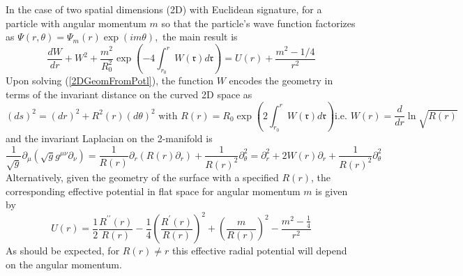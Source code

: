 \documentclass{article}%
\begin{document}
In the case of two spatial dimensions (2D) with Euclidean signature, for a
particle with angular momentum $m$ so that the particle's wave function
factorizes as $\Psi\left(  r,\theta\right)  =\Psi_{m}\left(  r\right)
\exp\left(  im\theta\right)  $,\ the main result is
\begin{equation}
\frac{dW}{dr}+W^{2}+\frac{m^{2}}{R_{0}^{2}}\exp\left(  -4\int_{r_{0}}%
^{r}W\left(  \mathfrak{r}\right)  d\mathfrak{r}\right)  =U\left(  r\right)
+\frac{m^{2}-1/4}{r^{2}} \label{2DGeomFromPotl}%
\end{equation}
Upon solving (\ref{2DGeomFromPotl}), the function $W$ encodes the geometry in
terms of the invariant distance on the curved 2D space as%
\begin{equation}
\left(  ds\right)  ^{2}=\left(  dr\right)  ^{2}+R^{2}\left(  r\right)  \left(
d\theta\right)  ^{2}\text{ \ \ with \ \ }R\left(  r\right)  =R_{0}\exp\left(
2\int_{r_{0}}^{r}W\left(  \mathfrak{r}\right)  d\mathfrak{r}\right)  \text{
\ \ i.e. \ \ }W\left(  r\right)  =\frac{d}{dr}\ln\sqrt{R\left(  r\right)  }
\label{2DMetric}%
\end{equation}
and the invariant Laplacian on the 2-manifold is%
\begin{equation}
\frac{1}{\sqrt{g}}\partial_{\mu}\left(  \sqrt{g}g^{\mu\nu}\partial_{\nu
}\right)  =\frac{1}{R\left(  r\right)  }\partial_{r}\left(  R\left(  r\right)
\partial_{r}\right)  +\frac{1}{R\left(  r\right)  ^{2}}\partial_{\theta}%
^{2}=\partial_{r}^{2}+2W\left(  r\right)  \partial_{r}+\frac{1}{R\left(
r\right)  ^{2}}\partial_{\theta}^{2} \label{2DInvLaplacian}%
\end{equation}
Alternatively, given the geometry of the surface with a specified $R\left(
r\right)  $, the corresponding effective potential in flat space for angular
momentum $m$ is given by%
\begin{equation}
U\left(  r\right)  =\frac{1}{2}\frac{R^{\prime\prime}\left(  r\right)
}{R\left(  r\right)  }-\frac{1}{4}\left(  \frac{R^{\prime}\left(  r\right)
}{R\left(  r\right)  }\right)  ^{2}+\left(  \frac{m}{R\left(  r\right)
}\right)  ^{2}-\frac{m^{2}-\frac{1}{4}}{r^{2}} \label{2DPotlFromGeom}%
\end{equation}
As should be expected, for $R\left(  r\right)  \neq r$ this effective radial
potential will depend on the angular momentum.
\end{document}
